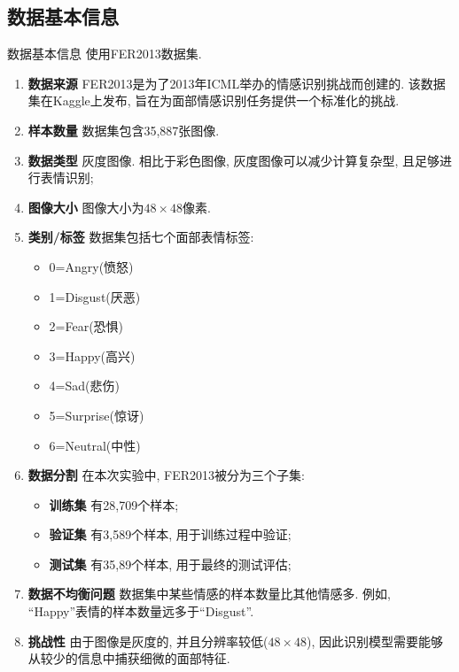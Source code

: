 \documentclass{beamer}
\begin{document}
\subsection{数据基本信息}
\begin{frame}[fragile]{数据基本信息}
	使用FER2013数据集.
	\begin{enumerate}
		\item<only@1> \textbf{数据来源} FER2013是为了2013年ICML举办的情感识别挑战而创建的. 该数据集在Kaggle上发布, 旨在为面部情感识别任务提供一个标准化的挑战.
		\item<only@1> \textbf{样本数量} 数据集包含35,887张图像.
		\item<only@1> \textbf{数据类型} 灰度图像. 相比于彩色图像, 灰度图像可以减少计算复杂型, 且足够进行表情识别;
		\item<only@1> \textbf{图像大小} 图像大小为$48\times 48$像素.
		\item<only@2> \textbf{类别/标签} 数据集包括七个面部表情标签:
			\begin{itemize}
				\item 0=Angry(愤怒)
				\item 1=Disgust(厌恶)
				\item 2=Fear(恐惧)
				\item 3=Happy(高兴)
				\item 4=Sad(悲伤)
				\item 5=Surprise(惊讶)
				\item 6=Neutral(中性)
			\end{itemize}
		\item<only@2> \textbf{数据分割} 在本次实验中, FER2013被分为三个子集:
			\begin{itemize}
				\item \textbf{训练集 } 有28,709个样本;
				\item \textbf{验证集 } 有3,589个样本, 用于训练过程中验证;
				\item \textbf{测试集 } 有35,89个样本, 用于最终的测试评估;
			\end{itemize}
		\item<only@3> \textbf{数据不均衡问题 } 数据集中某些情感的样本数量比其他情感多. 例如, ``Happy''表情的样本数量远多于``Disgust''.
		\item<only@3> \textbf{挑战性 } 由于图像是灰度的, 并且分辨率较低($48\times 48$), 因此识别模型需要能够从较少的信息中捕获细微的面部特征.
	\end{enumerate}
\end{frame}
\end{document}
